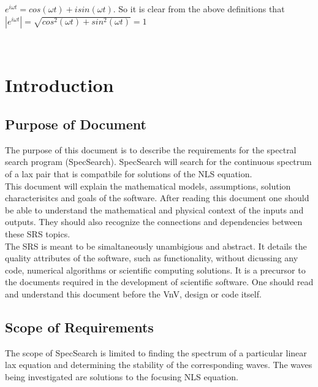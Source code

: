 \documentclass[12pt]{article}
\begin{document}
$ e^{i \omega t} = cos(\omega t) + i sin(\omega t)$. So it is clear from the 
above definitions that \\$ |e^{i \omega t}| = \sqrt{cos^{2} (\omega t) + 
sin^{2} (\omega t)} = 1$ \\ 


\newpage

\tableofcontents

~\newpage


\section{Introduction}

\subsection{Purpose of Document}
The purpose of this document is to describe the requirements for the spectral 
search program (SpecSearch). SpecSearch will search for the 
continuous spectrum of a lax pair that is compatbile for solutions 
of the NLS 
equation. \\ 

This document will explain the mathematical models, assumptions, 
solution characterisitcs and goals of the software. After reading this document 
one should be able to understand the mathematical and physical context of the 
inputs and outputs. They should also recognize the connections and 
dependencies between these SRS topics. \\

The SRS is meant to be simaltaneously unambigious and abstract. It details the 
quality attributes of the software, such as functionality, 
without dicussing any code, numerical algorithms or scientific computing 
solutions. It is a precursor to the documents required in the development of 
scientific software. One should read and understand this document before the 
VnV, design or code itself. \\


\subsection{Scope of Requirements} 

The scope of SpecSearch is limited to finding the spectrum of a particular 
linear lax equation and determining the stability of the corresponding waves. 
The waves being investigated are solutions to 
the focusing NLS equation. 
\end{document}
